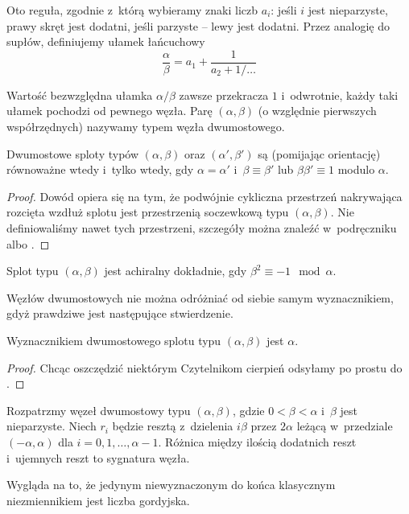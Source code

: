 
Oto reguła, zgodnie z~którą wybieramy znaki liczb $a_i$:
jeśli $i$ jest nieparzyste, prawy skręt jest dodatni, jeśli parzyste -- lewy jest dodatni.
Przez analogię do supłów, definiujemy ułamek łańcuchowy
\[
    \frac \alpha \beta = a_1 + \frac{1}{a_2 + 1/\ldots}
\]

Wartość bezwzględna ułamka $\alpha/\beta$ zawsze przekracza $1$ i~odwrotnie, każdy taki ułamek pochodzi od pewnego węzła.
Parę $(\alpha, \beta)$ (o względnie pierwszych współrzędnych) nazywamy typem węzła dwumostowego.

\begin{proposition}
\label{prp:tangle_equivalence}
    Dwumostowe sploty typów $(\alpha, \beta)$ oraz $(\alpha', \beta')$ są (pomijając orientację) równoważne wtedy i~tylko wtedy, gdy $\alpha = \alpha'$ i~$\beta \equiv \beta'$ lub $\beta \beta'\equiv 1$ modulo $\alpha$.
\end{proposition}

\begin{proof}
    Dowód opiera się na tym, że podwójnie cykliczna przestrzeń nakrywająca rozcięta wzdłuż splotu jest przestrzenią soczewkową typu $(\alpha, \beta)$.
    Nie definiowaliśmy nawet tych przestrzeni, szczegóły można znaleźć w~podręczniku \cite{murasugi96} albo \cite{schubert56}.
\end{proof}

\begin{proposition}
\label{prp:chiral_tangles}
    Splot typu $(\alpha, \beta)$ jest achiralny dokładnie, gdy $\beta^2 \equiv -1 \mod \alpha$.
\end{proposition}

Węzłów dwumostowych nie można odróżniać od siebie samym wyznacznikiem, gdyż prawdziwe jest następujące stwierdzenie.

\begin{proposition}
\label{prp:tangle_determinant}
    Wyznacznikiem dwumostowego splotu typu $(\alpha, \beta)$ jest $\alpha$.
\end{proposition}

\begin{proof}
    Chcąc oszczędzić niektórym Czytelnikom cierpień odsyłamy po prostu do \cite{schubert56}.
\end{proof}

\begin{proposition}
\label{prp:tangle_signature}
    Rozpatrzmy węzeł dwumostowy typu $(\alpha, \beta)$, gdzie $0 < \beta < \alpha$ i~$\beta$ jest nieparzyste.
    Niech $r_i$ będzie resztą z~dzielenia $i\beta$ przez $2\alpha$ leżącą w~przedziale $(-\alpha, \alpha)$ dla $i = 0, 1, \ldots, \alpha - 1$.
    Różnica między ilością dodatnich reszt i~ujemnych reszt to sygnatura węzła.
\end{proposition}

Wygląda na to, że jedynym niewyznaczonym do końca klasycznym niezmiennikiem jest liczba gordyjska.

